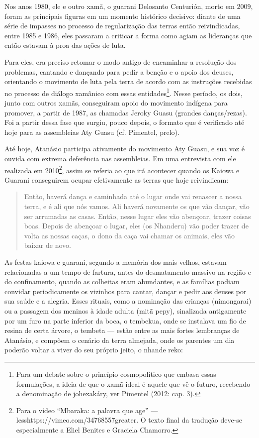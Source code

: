Nos anos 1980, ele e outro xamã, o guarani Delosanto Centurión, morto em
2009, foram as principais figuras em um momento histórico decisivo:
diante de uma série de impasses no processo de regularização das terras
então reivindicadas, entre 1985 e 1986, eles passaram a criticar a
forma como agiam as lideranças que então estavam à proa das ações de
luta.

Para eles, era preciso retomar o modo antigo de encaminhar a resolução
dos problemas, cantando e dançando para pedir a benção e o apoio dos
deuses, orientando o movimento de luta pela terra de acordo com as
instruções recebidas no processo de diálogo xamânico com essas
entidades\footnote{Para um debate sobre o princípio cosmopolítico que
embasa essas formulações, a ideia de que o xamã ideal é aquele que vê o
futuro, recebendo a denominação de johexakáry, ver Pimentel (2012: cap.
3).}. Nesse período, os dois, junto com outros xamãs, conseguiram apoio
do movimento indígena para promover, a partir de 1987, as chamadas
Jeroky Guasu (grandes danças/rezas). Foi a partir dessa fase que
surgiu, pouco depois, o formato que é verificado até hoje para as
assembleias Aty Guasu (cf. Pimentel, prelo).

Até hoje, Atanásio participa ativamente do movimento Aty Guasu, e sua
voz é ouvida com extrema deferência nas assembleias. Em uma entrevista
com ele realizada em 2010\footnote{Para o vídeo ``Mbaraka: a palavra que
age'' --- {less}https://vimeo.com/34768557{greater}. O texto
final da tradução deve-se especialmente a Eliel Benites e Graciela
Chamorro.}, assim se referia ao que irá acontecer quando os Kaiowa e
Guarani conseguirem ocupar efetivamente as terras que hoje reivindicam:

\begin{quotation}
Então, haverá dança e caminhada até o lugar onde vai renascer a nossa
terra, e é ali que nós vamos. Ali haverá novamente os que vão dançar,
vão ser arrumadas as casas. Então, nesse lugar eles vão abençoar,
trazer coisas boas. Depois de abençoar o lugar, eles (os Nhanderu) vão
poder trazer de volta as nossas caças, o dono da caça vai chamar os
animais, eles vão baixar de novo.
\end{quotation}

As festas kaiowa e guarani, segundo a memória dos mais velhos, estavam
relacionadas a um tempo de fartura, antes do desmatamento massivo na
região e do confinamento, quando as colheitas eram abundantes, e as
famílias podiam convidar periodicamente os vizinhos para cantar, dançar
e pedir aos deuses por sua saúde e a alegria. Esses rituais, como a
nominação das crianças (nimongarai) ou a passagem dos meninos à idade
adulta (mitã pepy), sinalizada antigamente por um furo na parte
inferior da boca, o tembekua, onde se instalava um fio de resina de
certa árvore, o tembeta --- estão entre as mais fortes lembranças de
Atanásio, e compõem o cenário da terra almejada, onde os parentes um
dia poderão voltar a viver do seu próprio jeito, o nhande reko:

